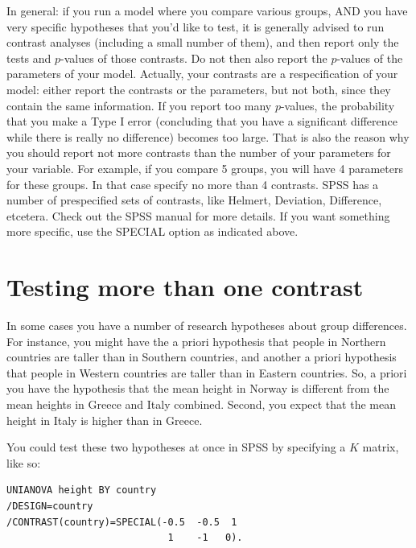 \documentclass[]{book}\usepackage[]{graphicx}\usepackage[]{color}
\begin{document}
In general: if you run a model where you compare various groups, AND you have very specific hypotheses that you'd like to test, it is generally advised to run contrast analyses (including a small number of them), and then report only the tests and $p$-values of those contrasts. Do not then also report the $p$-values of the parameters of your model. Actually, your contrasts are a respecification of your model: either report the contrasts or the parameters, but not both, since they contain the same information. If you report too many $p$-values, the probability that you make a Type I error (concluding that you have a significant difference while there is really no difference) becomes too large. That is also the reason why you should report not more contrasts than the number of your parameters for your variable. For example, if you compare 5 groups, you will have 4 parameters for these groups. In that case specify no more than 4 contrasts. SPSS has a number of prespecified sets of contrasts, like Helmert, Deviation, Difference, etcetera. Check out the SPSS manual for more details. If you want something more specific, use the SPECIAL option as indicated above. 


\section{Testing more than one contrast}

In some cases you have a number of research hypotheses about group differences. For instance, you might have the a priori hypothesis that people in Northern countries are taller than in Southern countries, and another a priori hypothesis that people in Western countries are taller than in Eastern countries. So, a priori you have the hypothesis that the mean height in Norway is different from the mean heights in Greece and Italy combined. Second, you expect that the mean height in Italy is higher than in Greece.

You could test these two hypotheses at once in SPSS by specifying a $K$ matrix, like so:

\begin{verbatim}
UNIANOVA height BY country
/DESIGN=country
/CONTRAST(country)=SPECIAL(-0.5  -0.5  1
                            1    -1   0).
\end{verbatim}
\end{document}
